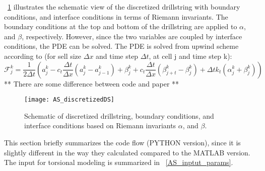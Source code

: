 \figurename~\ref{AS_discretizeDS} illustrates the schematic view of the discretized drillstring with boundary conditions, and interface conditions in terms of Riemann invariants. The boundary conditions at the top and bottom of the drillstring are applied to $\alpha$, and $\beta$, respectively. However, since the two variables are coupled by interface conditions, the PDE can be solved. 
The PDE is solved from upwind scheme according to (for sell size $\Delta x$ and time step $\Delta t$, at cell j and time step k):
\begin{equation}\label{AS-upwind}
  \mathcal{F}_{j}^k = \frac{1}{2 \Delta t}\left(a_j^k - c_t \frac{\Delta t}{\Delta x}(a_j^k - a_{j-1}^k) + \beta_j^k + c_t \frac{\Delta t}{\Delta x}(\beta_{j+t}^k-\beta_j^k) + \Delta t k_t (\alpha_j^k + \beta_j^k)\right)
\end{equation}
** There are some difference between code and paper **
\newpage
\begin{figure}[ht]
  \centering
  \texttt{[image: AS\_discretizedDS]}
  \caption[Schematic of discretized drillstring and boundary conditions]{Schematic of discretized drillstring, boundary conditions, and interface conditions based on Riemann invariants $\alpha$, and $\beta$.}\label{AS_discretizeDS}
\end{figure}

This section briefly summarizes the code flow (PYTHON version), since it is slightly different in the way they calculated compared to the MATLAB version. The input for torsional modeling is summarized in \tablename~\ref{AS_inptut_params}.

